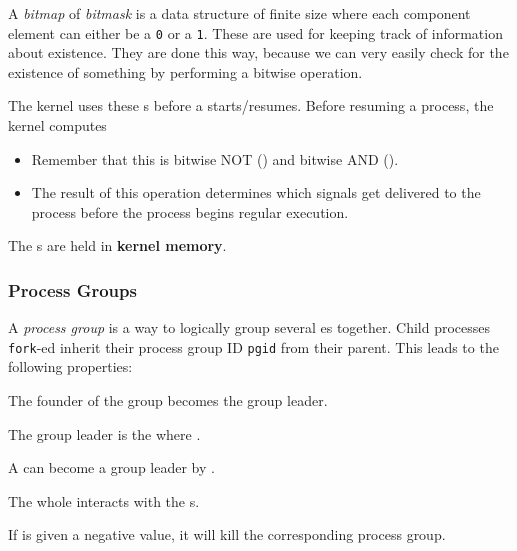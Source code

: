 \begin{definition}[Bitmap]\label{def:Bitmap}\label{def:Bitmask}
  A \emph{bitmap} of \emph{bitmask} is a data structure of finite size where each component element can either be a \texttt{0} or a \texttt{1}.
  These are used for keeping track of information about existence.
  They are done this way, because we can very easily check for the existence of something by performing a bitwise operation.
\end{definition}

The kernel uses these  s before a  starts/resumes.
Before resuming a process, the kernel computes 
\begin{itemize}[noitemsep]
\item Remember that this is bitwise NOT (\cinline{~}) and bitwise AND (\cinline{&}).
\item The result of this operation determines which signals get delivered to the process before the process begins regular execution.
   \end{itemize}

The  s are held in \textbf{kernel memory}.

\subsubsection{Process Groups}\label{subsubsec:Process_Groups}
\begin{definition}\label{def:Process_Group}
  A \emph{process group} is a way to logically group several es together.
  Child processes \texttt{fork}-ed inherit their process group ID \texttt{pgid} from their parent.
  This leads to the following properties:
  \begin{propertylist}
  \item The founder of the group becomes the group leader.
  \item The group leader is the  where .
  \item A  can become a group leader by .
  \item The whole  interacts with the s.
  \item If  is given a negative value, it will kill the corresponding process group.
  \end{propertylist}
\end{definition}

